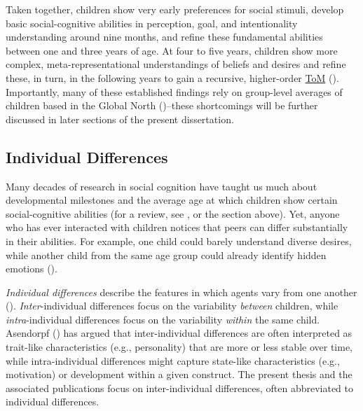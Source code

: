 \documentclass[
]{scrbook}
\begin{document}
Taken together, children show very early preferences for social stimuli, develop basic social-cognitive abilities in perception, goal, and intentionality understanding around nine months, and refine these fundamental abilities between one and three years of age. At four to five years, children show more complex, meta-representational understandings of beliefs and desires and refine these, in turn, in the following years to gain a recursive, higher-order \hyperref[acronyms_ToM]{ToM} (). Importantly, many of these established findings rely on group-level averages of children based in the Global North ()\thinspace --\thinspace these shortcomings will be further discussed in later sections of the present dissertation.

\subsection{Individual Differences}\label{individual-differences}

Many decades of research in social cognition have taught us much about developmental milestones and the average age at which children show certain social-cognitive abilities (for a review, see , or the section above). Yet, anyone who has ever interacted with children notices that peers can differ substantially in their abilities. For example, one child could barely understand diverse desires, while another child from the same age group could already identify hidden emotions ().

\emph{Individual differences} describe the features in which agents vary from one another (). \emph{Inter}-individual differences focus on the variability \emph{between} children, while \emph{intra}-individual differences focus on the variability \emph{within} the same child. Asendorpf () has argued that inter-individual differences are often interpreted as trait-like characteristics (e.g., personality) that are more or less stable over time, while intra-individual differences might capture state-like characteristics (e.g., motivation) or development within a given construct. The present thesis and the associated publications focus on inter-individual differences, often abbreviated to individual differences.
\end{document}
